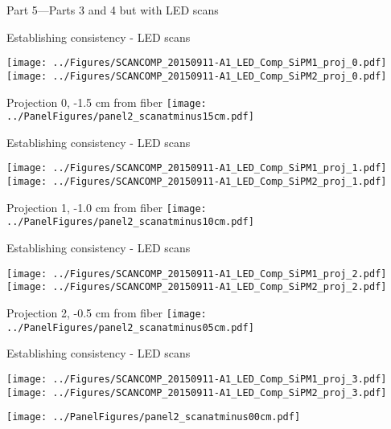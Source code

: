 \documentclass[compress,8pt]{beamer} %
\begin{document}



\begin{frame}
Part 5---Parts 3 and 4 but with LED scans
\end{frame}


\begin{frame}{Establishing consistency - LED scans}
\begin{adjustwidth}{-2em}{-2em}
\texttt{[image: ../Figures/SCANCOMP\_20150911-A1\_LED\_Comp\_SiPM1\_proj\_0.pdf]}
\texttt{[image: ../Figures/SCANCOMP\_20150911-A1\_LED\_Comp\_SiPM2\_proj\_0.pdf]}
\end{adjustwidth}
Projection 0, -1.5 cm from fiber
\hfill \texttt{[image: ../PanelFigures/panel2\_scanatminus15cm.pdf]}
\end{frame}

\begin{frame}{Establishing consistency - LED scans}
\begin{adjustwidth}{-2em}{-2em}
\texttt{[image: ../Figures/SCANCOMP\_20150911-A1\_LED\_Comp\_SiPM1\_proj\_1.pdf]}
\texttt{[image: ../Figures/SCANCOMP\_20150911-A1\_LED\_Comp\_SiPM2\_proj\_1.pdf]}
\end{adjustwidth}
Projection 1, -1.0 cm from fiber
\hfill \texttt{[image: ../PanelFigures/panel2\_scanatminus10cm.pdf]}
\end{frame}

\begin{frame}{Establishing consistency - LED scans}
\begin{adjustwidth}{-2em}{-2em}
\texttt{[image: ../Figures/SCANCOMP\_20150911-A1\_LED\_Comp\_SiPM1\_proj\_2.pdf]}
\texttt{[image: ../Figures/SCANCOMP\_20150911-A1\_LED\_Comp\_SiPM2\_proj\_2.pdf]}
\end{adjustwidth}
Projection 2, -0.5 cm from fiber
\hfill \texttt{[image: ../PanelFigures/panel2\_scanatminus05cm.pdf]}
\end{frame}

\begin{frame}{Establishing consistency - LED scans}
\begin{adjustwidth}{-2em}{-2em}
\texttt{[image: ../Figures/SCANCOMP\_20150911-A1\_LED\_Comp\_SiPM1\_proj\_3.pdf]}
\texttt{[image: ../Figures/SCANCOMP\_20150911-A1\_LED\_Comp\_SiPM2\_proj\_3.pdf]}
\end{adjustwidth}
\hfill \texttt{[image: ../PanelFigures/panel2\_scanatminus00cm.pdf]} \\
\end{frame}
\end{document}
